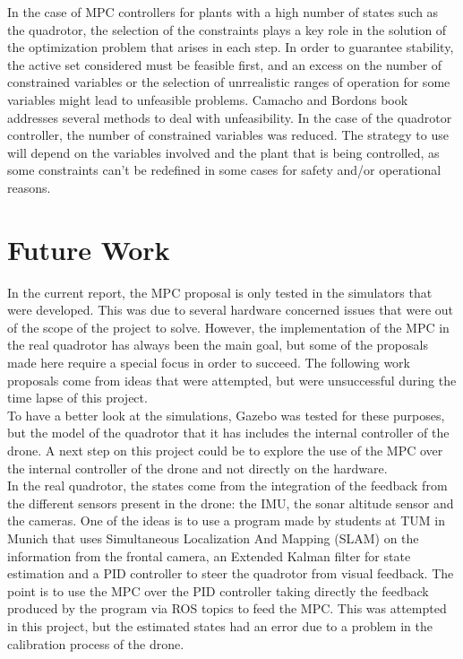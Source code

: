 In the case of MPC controllers for plants with a high number of states such as the quadrotor, the selection of the constraints plays a key role in the solution of the optimization problem that arises in each step. In order to guarantee stability, the active set considered must be feasible first, and an excess on the number of constrained variables or the selection of unrrealistic ranges of operation for some variables might lead to unfeasible problems. Camacho and Bordons \cite{CamachoBordons} book addresses several methods to deal with unfeasibility. In the case of the quadrotor controller, the number of constrained variables was reduced. The strategy to use will depend on the variables involved and the plant that is being controlled, as some constraints can't be redefined in some cases for safety and/or operational reasons. \\


\section{Future Work}

In the current report, the MPC proposal is only tested in the simulators that were developed. This was due to several hardware concerned issues that were out of the scope of the project to solve. However, the implementation of the MPC in the real quadrotor has always been the main goal, but some of the proposals made here require a special focus in order to succeed. The following work proposals come from ideas that were attempted, but were unsuccessful during the time lapse of this project.\\

To have a better look at the simulations, Gazebo was tested for these purposes, but the model of the quadrotor that it has includes the internal controller of the drone. A next step on this project could be to explore the use of the MPC over the internal controller of the drone and not directly on the hardware.\\

In the real quadrotor, the states come from the integration of the feedback from the different sensors present in the drone: the IMU, the sonar altitude sensor and the cameras. One of the ideas is to use a program made by students at TUM in Munich that uses Simultaneous Localization And Mapping (SLAM) on the information from the frontal camera, an Extended Kalman filter for state estimation and a PID controller to steer the quadrotor from visual feedback. The point is to use the MPC over the PID controller taking directly the feedback produced by the program via ROS topics to feed the MPC. This was attempted in this project, but the estimated states had an error due to a problem in the calibration process of the drone.\\










